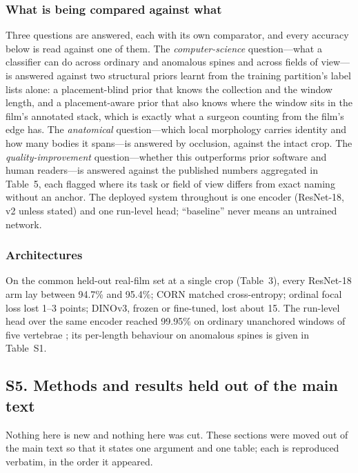 \documentclass[11pt,letterpaper]{article}
\begin{document}
\subsubsection*{What is being compared against what}
Three questions are answered, each with its own comparator, and every accuracy below is read against one of them. The \emph{computer-science} question---what a classifier can do across ordinary and anomalous spines and across fields of view---is answered against two structural priors learnt from the training partition's label lists alone: a placement-blind prior that knows the collection and the window length, and a placement-aware prior that also knows where the window sits in the film's annotated stack, which is exactly what a surgeon counting from the film's edge has. The \emph{anatomical} question---which local morphology carries identity and how many bodies it spans---is answered by occlusion, against the intact crop. The \emph{quality-improvement} question---whether this outperforms prior software and human readers---is answered against the published numbers aggregated in Table~5, each flagged where its task or field of view differs from exact naming without an anchor. The deployed system throughout is one encoder (ResNet-18, v2 unless stated) and one run-level head; ``baseline'' never means an untrained network.

\subsubsection*{Architectures}
On the common held-out real-film set at a single crop (Table~3), every ResNet-18 arm lay between 94.7\% and 95.4\%; CORN matched cross-entropy; ordinal focal loss lost 1--3 points; DINOv3, frozen or fine-tuned, lost about 15. The run-level head over the same encoder reached 99.95\% on ordinary unanchored windows of five vertebrae \citep{schwing2026mixed}; its per-length behaviour on anomalous spines is given in Table~S1.


\subsection*{S5. Methods and results held out of the main text}
Nothing here is new and nothing here was cut. These sections were moved out of the main text so that it states one argument and one table; each is reproduced verbatim, in the order it appeared.

\end{document}
